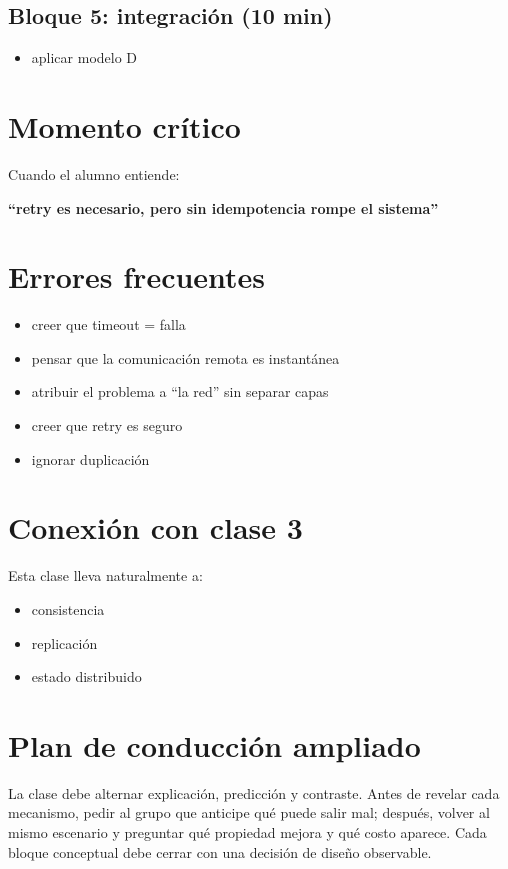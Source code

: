 \documentclass[variant=docente,cover=institutional,mode=screen]{ua-engineering-v6-article}
\begin{document}
\subsection*{Bloque 5: integración (10 min)}

\begin{itemize}
\item aplicar modelo D
\end{itemize}

\section{Momento crítico}

Cuando el alumno entiende:

\begin{center}
\textbf{“retry es necesario, pero sin idempotencia rompe el sistema”}
\end{center}

\section{Errores frecuentes}

\begin{itemize}
\item creer que timeout = falla
\item pensar que la comunicación remota es instantánea
\item atribuir el problema a ``la red'' sin separar capas
\item creer que retry es seguro
\item ignorar duplicación
\end{itemize}

\section{Conexión con clase 3}

Esta clase lleva naturalmente a:

\begin{itemize}
\item consistencia
\item replicación
\item estado distribuido
\end{itemize}


\section{Plan de conducción ampliado}
La clase debe alternar explicación, predicción y contraste. Antes de revelar cada mecanismo, pedir al grupo que anticipe qué puede salir mal; después, volver al mismo escenario y preguntar qué propiedad mejora y qué costo aparece. Cada bloque conceptual debe cerrar con una decisión de diseño observable.
\end{document}
